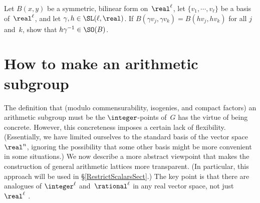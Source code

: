 \begin{exercises}
 \item \label{hgammainG}
 Let $B(x,y)$ be a symmetric, bilinear form on~$\real^\ell$, 
 let $\{v_1,\cdots,v_\ell\}$ be a  basis of~$\real^\ell$,
and let $\gamma,h \in \SL(\ell,\real)$.
 If $B(\gamma v_j, \gamma v_k) = B(h v_j, h v_k)$ for all $j$ and~$k$, 
 show that $h \gamma^{-1} \in \SO(B)$.

\end{exercises}






\section{How to make an arithmetic subgroup}
\label{MakeArithLattSect}

The definition that (modulo commensurability, isogenies, and
compact factors) an arithmetic subgroup must be the
$\integer$-points of~$G$ has the virtue of being concrete.
However, this concreteness imposes a certain lack of
flexibility. (Essentially, we have limited ourselves to the
standard basis of the vector space~$\real^n$, ignoring the
possibility that some other basis might be more convenient
in some situations.) We now describe a more abstract
viewpoint that makes the construction of general arithmetic
lattices more transparent. (In particular, this approach
will be used in \S\ref{RestrictScalarsSect}.) The key point is that there are analogues of $\integer^\ell$ and~$\rational^\ell$ in any real
vector space, not just~$\real^\ell$ .

